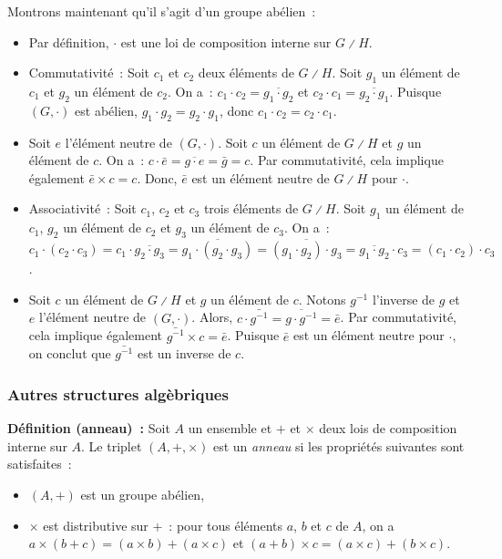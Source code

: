     Montrons maintenant qu'il s'agit d'un groupe abélien : 
    \begin{itemize}[nosep]
        \item Par définition, $\cdot$ est une loi de composition interne sur $G \divslash H$.
        \item Commutativité : Soit $c_1$ et $c_2$ deux éléments de $G \divslash H$.
            Soit $g_1$ un élément de $c_1$ et $g_2$ un élément de $c_2$. 
            On a : $c_1 \cdot c_2 = \overline{g_1 \cdot g_2}$ et $c_2 \cdot c_1 = \overline{g_2 \cdot g_1}$.
            Puisque $(G, \cdot)$ est abélien, $g_1 \cdot g_2 = g_2 \cdot g_1$, donc $c_1 \cdot c_2 = c_2 \cdot c_1$.
        \item Soit $e$ l'élément neutre de $(G, \cdot)$. 
            Soit $c$ un élément de $G \divslash H$ et $g$ un élément de $c$. 
            On a : $c \cdot \bar{e} = \overline{g \cdot e} = \bar{g} = c$.
            Par commutativité, cela implique également $\bar{e} \times c = c$.
            Donc, $\bar{e}$ est un élément neutre de $G \divslash H$ pour $\cdot$.
        \item Associativité : Soit $c_1$, $c_2$ et $c_3$ trois éléments de $G \divslash H$.
            Soit $g_1$ un élément de $c_1$, $g_2$ un élément de $c_2$ et $g_3$ un élément de $c_3$.
            On a : $c_1 \cdot (c_2 \cdot c_3) = c_1 \cdot \overline{g_2 \cdot g_3} = \overline{g_1 \cdot (g_2 \cdot g_3)} = \overline{(g_1 \cdot g_2) \cdot g_3} = \overline{g_1 \cdot g_2} \cdot c_3 = (c_1 \cdot c_2) \cdot c_3$.
        \item Soit $c$ un élément de $G \divslash H$ et $g$ un élément de $c$. 
            Notons $g^{-1}$ l'inverse de $g$ et $e$ l'élément neutre de $(G,\cdot)$. 
            Alors, $c \cdot \bar{g^{-1}} = \overline{g \cdot g^{-1}} = \bar{e}$.
            Par commutativité, cela implique également $\bar{g^{-1}} \times c = \bar{e}$.
            Puisque $\bar{e}$ est un élément neutre pour $\cdot$, on conclut que $\bar{g^{-1}}$ est un inverse de $c$.
    \end{itemize}

    \done

\subsubsection{Autres structures algèbriques}

\noindent\textbf{Définition (anneau) :} Soit $A$ un ensemble et $+$ et $\times$ deux lois de composition interne sur $A$. 
    Le triplet $(A, +, \times)$ est un \textit{anneau} si les propriétés suivantes sont satisfaites : 
    \begin{itemize}[nosep]
        \item $(A,+)$ est un groupe abélien,
        \item $\times$ est distributive sur $+$ : pour tous éléments $a$, $b$ et $c$ de $A$, on a $a \times (b + c) = (a \times b) + (a \times c)$ et $(a + b) \times c = (a \times c) + (b \times c)$.
    \end{itemize}

